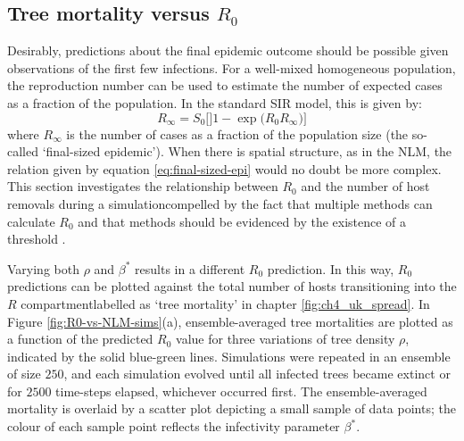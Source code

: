 \subsection{Tree mortality versus $R_0$}
\label{sec:tree-mortality-analytic}

Desirably, predictions about the final epidemic outcome should be possible given observations of the first few infections. 
For a well-mixed homogeneous population, the reproduction number can be used to estimate the number of expected cases as a fraction of the population.
In the standard SIR model, this is given by:
\begin{equation}
\label{eq:final-sized-epi}
    R_{\infty} = S_0\Big[]1 - \exp\big( R_0 R_\infty\big) \Big]
\end{equation}
where $R_\infty$ is the number of cases as a fraction of the population size (the so-called `final-sized epidemic'). 
When there is spatial structure, as in the NLM, the relation given by equation \ref{eq:final-sized-epi} would no doubt be more complex.
This section investigates the relationship between $R_0$ and the number of host removals during a simulation\textemdash compelled by the fact that multiple methods can calculate $R_0$ and that methods should be evidenced by the existence of a threshold \cite{li2011failure}.

Varying both $\rho$ and $\beta^*$ results in a different $R_0$ prediction.
In this way, $R_0$ predictions can be plotted against the total number of hosts transitioning into the $R$ compartment\textemdash labelled as `tree mortality' in chapter \ref{fig:ch4_uk_spread}.
In Figure \ref{fig:R0-vs-NLM-sims}(a), ensemble-averaged tree mortalities are plotted as a function of the predicted $R_0$ value for three variations of tree density $\rho$, indicated by the solid blue-green lines.
Simulations were repeated in an ensemble of size $250$, and each simulation evolved until all infected trees became extinct or for $2500$ time-steps elapsed, whichever occurred first.
The ensemble-averaged mortality is overlaid by a scatter plot depicting a small sample of data points; the colour of each sample point reflects the infectivity parameter $\beta^*$.

